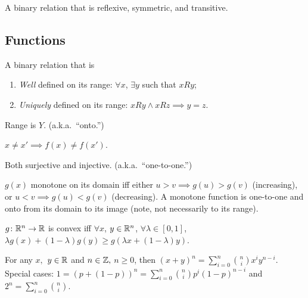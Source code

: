 \documentclass[8pt,letterpaper, landscape]{extarticle} %
\begin{document}
\begin{multicols}{3}
\begin{description}
 A binary relation that is reflexive, symmetric, and transitive.

\subsection{Functions}
 A binary relation that is
\begin{enumerate}
\item \textit{Well} defined on its range: $ \forall x $, $ \exists y $ such that $ xRy $;
\item \textit{Uniquely} defined on its range: $ xRy \land xRz \implies y=z $.
\end{enumerate}

 Range is $ Y $. (a.k.a.\ ``onto.'')

 $ x \neq x' \implies f(x) \neq f(x') $.

 Both surjective and injective. (a.k.a.\ ``one-to-one.'')

 $ g(x) $ monotone on its domain iff either $ u > v \implies g(u) > g(v) $ (increasing), or $ u < v \implies g(u) < g(v) $ (decreasing). A monotone function is one-to-one and onto from its domain to its image (note, not necessarily to its range).

 $ g \colon \mathbb{R}^n \to \mathbb{R} $ is convex iff $ \forall x $, $ y \in \mathbb{R}^n $, $ \forall \lambda \in [0,1] $, $ \lambda g(x) + (1-\lambda) g(y) \geq g (\lambda x + (1-\lambda) y) $.

 For any $ x, $ $ y \in \mathbb{R} $ and $ n \in \mathbb{Z}, $ $ n \geq 0 $, then $ (x+y)^n = \sum_{i=0}^n \binom{n}{i} x^i y^{n-i} $. Special cases: $ 1 = (p + (1-p))^n = \sum_{i=0}^n \binom{n}{i} p^i (1-p)^{n-i} $ and $ 2^n = \sum_{i=0}^n \binom{n}{i} $.


\end{description}
\end{multicols}
\end{document}
